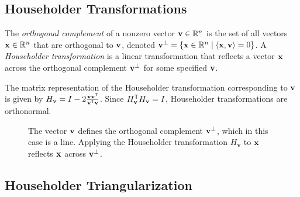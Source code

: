 \subsection*{Householder Transformations} %

The \emph{orthogonal complement} of a nonzero vector $\mathbf{v} \in \mathbb{R}^n$ is the set of all vectors $\mathbf{x} \in \mathbb{R}^n$ that are orthogonal to $\mathbf{v}$, denoted $\mathbf{v}^\perp = \{ \mathbf{x} \in \mathbb{R}^n \mid \langle \mathbf{x}, \mathbf{v} \rangle = 0 \}$.
A \emph{Householder transformation} is a linear transformation that reflects a vector $\mathbf{x}$ across the orthogonal complement $\mathbf{v}^\perp$ for some specified $\mathbf{v}$.

The matrix representation of the Householder transformation corresponding to $\mathbf{v}$ is given by $H_{\mathbf{v}} = I - 2\frac{\mathbf{v}\mathbf{v}^{\mathsf T}}{\mathbf{v}^{\mathsf T}\mathbf{v}}$.
Since $H_{\mathbf{v}}^{\mathsf T} H_{\mathbf{v}} = I$, Householder transformations are orthonormal.

\begin{figure}[H]
\centering
{}
\caption{The vector $\mathbf{v}$ defines the orthogonal complement $\mathbf{v}^\perp$, which in this case is a line.
Applying the Householder transformation $H_{\mathbf{v}}$ to $\mathbf{x}$ reflects $\mathbf{x}$ across $\mathbf{v}^\perp$.}
\label{fig:Householder_reflector}
\end{figure}

\subsection*{Householder Triangularization} %

